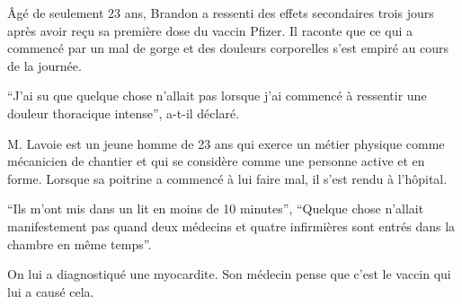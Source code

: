 Âgé de seulement 23 ans, Brandon a ressenti des effets secondaires trois jours
après avoir reçu sa première dose du vaccin Pfizer. Il raconte que ce qui a
commencé par un mal de gorge et des douleurs corporelles s'est empiré au cours
de la journée.

“J'ai su que quelque chose n'allait pas lorsque j'ai commencé à ressentir une
douleur thoracique intense”, a-t-il déclaré.

M. Lavoie est un jeune homme de 23 ans qui exerce un métier physique comme
mécanicien de chantier et qui se considère comme une personne active et en
forme. Lorsque sa poitrine a commencé à lui faire mal, il s'est rendu à
l'hôpital.

“Ils m'ont mis dans un lit en moins de 10 minutes”, “Quelque chose n'allait
manifestement pas quand deux médecins et quatre infirmières sont entrés dans la
chambre en même temps”.

On lui a diagnostiqué une myocardite. Son médecin pense que c'est le vaccin qui
lui a causé cela.

